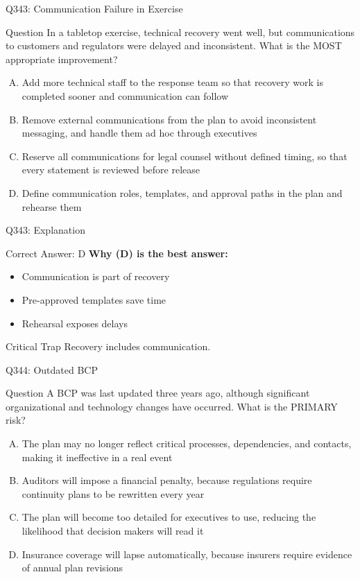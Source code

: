 \documentclass{beamer}
\begin{document}
	\begin{frame}{Q343: Communication Failure in Exercise}
		\begin{block}{Question}
			\small In a tabletop exercise, technical recovery went well, but communications to customers and regulators were delayed and inconsistent. What is the MOST appropriate improvement?
		\end{block}
		\begin{enumerate}[(A)]
			\footnotesize
			\item Add more technical staff to the response team so that recovery work is completed sooner and communication can follow
			\item Remove external communications from the plan to avoid inconsistent messaging, and handle them ad hoc through executives
			\item Reserve all communications for legal counsel without defined timing, so that every statement is reviewed before release
			\item Define communication roles, templates, and approval paths in the plan and rehearse them
		\end{enumerate}
	\end{frame}
	
	\begin{frame}{Q343: Explanation}
		\begin{block}{Correct Answer: D}
			\textbf{Why (D) is the best answer:}
			\begin{itemize}
				\item Communication is part of recovery
				\item Pre-approved templates save time
				\item Rehearsal exposes delays
			\end{itemize}
		\end{block}
		\begin{alertblock}{Critical Trap}
			Recovery includes communication.
		\end{alertblock}
	\end{frame}
	
	\begin{frame}{Q344: Outdated BCP}
		\begin{block}{Question}
			\small A BCP was last updated three years ago, although significant organizational and technology changes have occurred. What is the PRIMARY risk?
		\end{block}
		\begin{enumerate}[(A)]
			\footnotesize
			\item The plan may no longer reflect critical processes, dependencies, and contacts, making it ineffective in a real event
			\item Auditors will impose a financial penalty, because regulations require continuity plans to be rewritten every year
			\item The plan will become too detailed for executives to use, reducing the likelihood that decision makers will read it
			\item Insurance coverage will lapse automatically, because insurers require evidence of annual plan revisions
		\end{enumerate}
	\end{frame}
	
\end{document}
